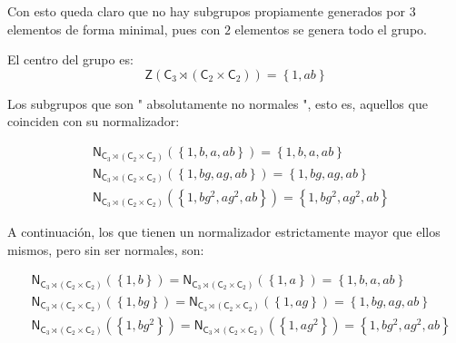 \documentclass[12pt,a4paper,fleqn,spanish,final,openright]{extbook}
\theoremstyle{definition}
\theoremstyle{remark}
\begin{document}
Con esto queda claro que no hay subgrupos propiamente generados por $3$ elementos de forma minimal, pues con $2$ elementos se genera todo el grupo.

El centro del grupo es:
\[
\mathsf{Z}\left({{\mathsf{C}_{3}}\rtimes({\mathsf{C}_{2}}   \times   {\mathsf{C}_{2}})}\right) = {\left\lbrace{1,ab}\right\rbrace}
\]


Los subgrupos que son " absolutamente no normales ", esto es, aquellos que coinciden con su normalizador:


\begin{align*}
&
\mathsf{N}_{{\mathsf{C}_{3}}\rtimes({\mathsf{C}_{2}}   \times   {\mathsf{C}_{2}})}
\left(
{\left\lbrace
{1,b,a,ab}
\right\rbrace}
\right) =
{\left\lbrace
{1,b,a,ab}
\right\rbrace}\\
&
\mathsf{N}_{{\mathsf{C}_{3}}\rtimes({\mathsf{C}_{2}}   \times   {\mathsf{C}_{2}})}
\left(
{\left\lbrace
{1,bg,ag,ab}
\right\rbrace}
\right) =
{\left\lbrace
{1,bg,ag,ab}
\right\rbrace}\\
&
\mathsf{N}_{{\mathsf{C}_{3}}\rtimes({\mathsf{C}_{2}}   \times   {\mathsf{C}_{2}})}
\left(
{\left\lbrace
{1,bg^2,ag^2,ab}
\right\rbrace}
\right) =
{\left\lbrace
{1,bg^2,ag^2,ab}
\right\rbrace}
\end{align*}

A continuación, los que tienen un normalizador estrictamente mayor que ellos mismos, pero sin ser normales, son:

\begin{align*}
&\mathsf{N}_{{\mathsf{C}_{3}}\rtimes({\mathsf{C}_{2}}   \times   {\mathsf{C}_{2}})}
\left({\left\lbrace{1,b}\right\rbrace}\right) =
\mathsf{N}_{{\mathsf{C}_{3}}\rtimes({\mathsf{C}_{2}}   \times   {\mathsf{C}_{2}})}
\left({\left\lbrace{1,a}\right\rbrace}\right) =
\left\lbrace{1,b,a,ab}\right\rbrace
\\
&\mathsf{N}_{{\mathsf{C}_{3}}\rtimes({\mathsf{C}_{2}}   \times   {\mathsf{C}_{2}})}
\left({\left\lbrace{1,bg}\right\rbrace}\right) =
\mathsf{N}_{{\mathsf{C}_{3}}\rtimes({\mathsf{C}_{2}}   \times   {\mathsf{C}_{2}})}
\left({\left\lbrace{1,ag}\right\rbrace}\right) =
{\left\lbrace{1,bg,ag,ab}\right\rbrace}
\\
&\mathsf{N}_{{\mathsf{C}_{3}}\rtimes({\mathsf{C}_{2}}   \times   {\mathsf{C}_{2}})}
\left({\left\lbrace{1,bg^2}\right\rbrace}\right) =
\mathsf{N}_{{\mathsf{C}_{3}}\rtimes({\mathsf{C}_{2}}   \times   {\mathsf{C}_{2}})}
\left({\left\lbrace{1,ag^2}\right\rbrace}\right) =
{\left\lbrace{1,bg^2,ag^2,ab}\right\rbrace}
\end{align*}
\end{document}
